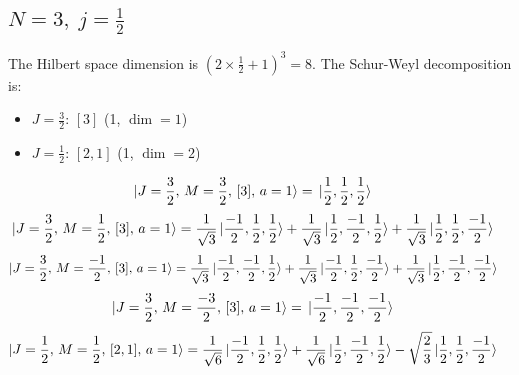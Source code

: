 \documentclass{article}
\begin{document}
\subsection*{$N=3,\; j=\frac{1}{2}$}

The Hilbert space dimension is $(2\times \frac{1}{2} +1)^{3}=8$.
The Schur-Weyl decomposition is:
\begin{itemize}
  \item $J=\frac{3}{2}$: $[3]$ (1, $\dim = 1$)
  \item $J=\frac{1}{2}$: $[2,1]$ (1, $\dim = 2$)
\end{itemize}

\begin{equation*}
\begin{aligned}
\ket{J=\frac{3}{2},\,M=\frac{3}{2},\,[3],\,a=1} = \; &\ket{\frac{1}{2},\frac{1}{2},\frac{1}{2}}
\end{aligned}
\end{equation*}
\begin{equation*}
\begin{aligned}
\ket{J=\frac{3}{2},\,M=\frac{1}{2},\,[3],\,a=1} = \; &\frac{1}{\sqrt{3}} \ket{\frac{-1}{2},\frac{1}{2},\frac{1}{2}} + \frac{1}{\sqrt{3}} \ket{\frac{1}{2},\frac{-1}{2},\frac{1}{2}} + \frac{1}{\sqrt{3}} \ket{\frac{1}{2},\frac{1}{2},\frac{-1}{2}}
\end{aligned}
\end{equation*}
\begin{equation*}
\begin{aligned}
\ket{J=\frac{3}{2},\,M=\frac{-1}{2},\,[3],\,a=1} = \; &\frac{1}{\sqrt{3}} \ket{\frac{-1}{2},\frac{-1}{2},\frac{1}{2}} + \frac{1}{\sqrt{3}} \ket{\frac{-1}{2},\frac{1}{2},\frac{-1}{2}} + \frac{1}{\sqrt{3}} \ket{\frac{1}{2},\frac{-1}{2},\frac{-1}{2}}
\end{aligned}
\end{equation*}
\begin{equation*}
\begin{aligned}
\ket{J=\frac{3}{2},\,M=\frac{-3}{2},\,[3],\,a=1} = \; &\ket{\frac{-1}{2},\frac{-1}{2},\frac{-1}{2}}
\end{aligned}
\end{equation*}
\begin{equation*}
\begin{aligned}
\ket{J=\frac{1}{2},\,M=\frac{1}{2},\,[2,1],\,a=1} = \; &\frac{1}{\sqrt{6}} \ket{\frac{-1}{2},\frac{1}{2},\frac{1}{2}} + \frac{1}{\sqrt{6}} \ket{\frac{1}{2},\frac{-1}{2},\frac{1}{2}} - \sqrt{\frac{2}{3}} \ket{\frac{1}{2},\frac{1}{2},\frac{-1}{2}}
\end{aligned}
\end{equation*}
\end{document}
